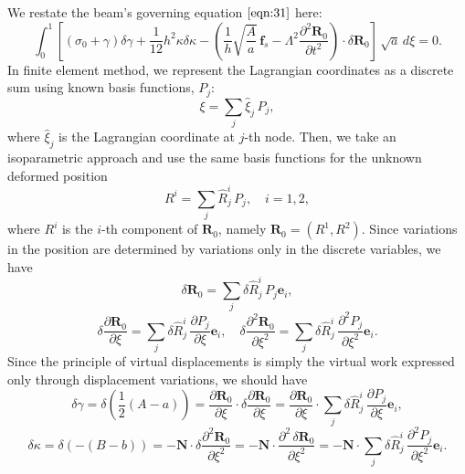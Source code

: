 \documentclass[12pt,MSc,twoside]{muthesis_2020}
\begin{document}
We restate the beam's governing equation $\eqref{eqn:31}$ here:
\begin{equation}
	\label{eqn:66}
	\int^1_0 \left[(\sigma_0+\gamma)\delta\gamma+\frac{1}{12}h^2\kappa\delta\kappa-\left(\frac{1}{h}\sqrt{\frac{A}{a}}\,\textbf{f}_{s}-\Lambda^2\frac{\partial^2\textbf{R}_0}{\partial t^2}
	\right)\cdot \delta \textbf{R}_0
	\right]\,\sqrt{a}\,d\xi=0.
\end{equation}
In finite element method, we represent the Lagrangian coordinates as a discrete sum using known basis functions, $P_j$:
\begin{equation}
	\label{eqn:68}
	\xi=\sum_j \hat{\xi}_j\, P_j,
\end{equation}
where $\hat{\xi}_j$ is the Lagrangian coordinate at $j$-th node. Then, we take an isoparametric approach and use the same basis functions for the unknown deformed position
\begin{equation}
	\label{eqn:69}
	R^i=\sum_j \hat{R}_j^i\, P_j,\quad i=1,2,
\end{equation}
where $R^i$ is the $i$-th component of $\mathbf{R}_0$, namely $\mathbf{R}_0=(R^1, R^2)$.
Since variations in the position are determined by variations only in the discrete variables, we have 
\begin{equation}
	\label{eqn:70}
	\delta\mathbf{R}_0=\sum_j \delta\hat{R}_j^i\, P_j\mathbf{e}_i,
\end{equation}
\begin{equation}
	\label{eqn:71}
	\delta\frac{\partial\mathbf{R}_0}{\partial\xi}=\sum_j \delta\hat{R}_j^i\, \frac{\partial P_j}{\partial\xi}\mathbf{e}_i, \quad \delta\frac{\partial^2\mathbf{R}_0}{\partial\xi^2}=\sum_j \delta\hat{R}_j^i\, \frac{\partial^2 P_j}{\partial\xi^2}\mathbf{e}_i.
\end{equation}
Since the principle of virtual displacements is simply the virtual work expressed only through displacement variations, we should have
\begin{equation}
	\label{eqn:72}
	\delta\gamma=\delta\left(\frac{1}{2}(A-a)\right)=\frac{\partial\mathbf{R}_0}{\partial\xi}\cdot\delta\frac{\partial\mathbf{R}_0}{\partial\xi}=\frac{\partial\mathbf{R}_0}{\partial\xi}\cdot\sum_j \delta\hat{R}_j^i\, \frac{\partial P_j}{\partial\xi}\mathbf{e}_i,
\end{equation}
\begin{equation}
	\label{eqn:73}
	\delta\kappa=\delta\left(-(B-b)\right)=-\mathbf{N}\cdot\delta\frac{\partial^2\mathbf{R}_0}{\partial\xi^2}=-\mathbf{N}\cdot\frac{\partial^2\,\delta\mathbf{R}_0}{\partial\xi^2}=-\mathbf{N}\cdot\sum_j \delta\hat{R}_j^i\,\frac{\partial^2 P_j}{\partial\xi^2}\mathbf{e}_i.
\end{equation}
\end{document}
